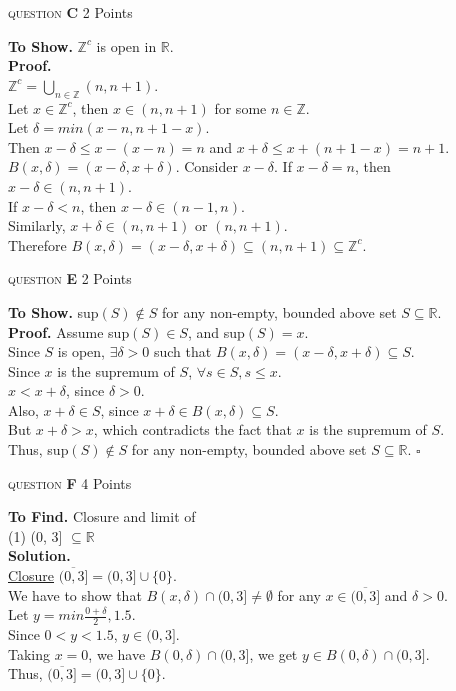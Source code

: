 \documentclass[11pt]{article}
\newcommand{\problem
}[2]{
\begin{mdframed}
    \textsc{question} \textbf{#1} \hfill #2
\end{mdframed}
}
\begin{document}
\problem{C}{2 Points}
\textbf{To Show. } $\mathbb{Z}^c$ is open in $\mathbb{R}$.\\
\textbf{Proof.}\\
$\mathbb{Z}^c = \underset{n \in \mathbb{Z}}{\bigcup} (n, n + 1)$.\\
Let $x \in \mathbb{Z}^c$, then $x \in (n, n + 1)$ for some $n \in \mathbb{Z}$.\\
Let $\delta = min(x - n, n + 1 - x)$.\\
Then $x - \delta \leq x - (x - n) = n$ and $x + \delta \leq x + (n + 1 - x) = n + 1$.\\
$B(x, \delta) = (x - \delta, x + \delta)$.
Consider $x - \delta$. If $x - \delta = n$, then $x - \delta \in (n, n + 1)$.\\
If $x - \delta < n$, then $x - \delta \in (n - 1, n)$.\\
Similarly, $x + \delta \in (n, n + 1)$ or $(n, n + 1)$.\\

\noindent Therefore $B(x, \delta) = (x - \delta, x + \delta) \subseteq (n, n + 1) \subseteq \mathbb{Z}^c$.\\


\problem{E}{2 Points}
\textbf{To Show.} sup$(S) \not\in S$ for any non-empty, bounded above set $S \subseteq \mathbb{R}$.\\
\textbf{Proof.} Assume sup$(S) \in S$, and sup$(S) = x$.\\
Since $S$ is open, $\exists \delta > 0$ such that $B(x, \delta) = (x - \delta, x + \delta) \subseteq S$.\\
Since $x$ is the supremum of $S$, $\forall s \in S, s \leq x$.
\\ $x < x + \delta$, since $\delta > 0$.\\
Also, $x + \delta \in S$, since $x + \delta \in B(x, \delta) \subseteq S$.\\
But $x + \delta > x$, which contradicts the fact that $x$ is the supremum of $S$.\\
Thus, sup$(S) \not\in S$ for any non-empty, bounded above set $S \subseteq \mathbb{R}$. \hfill $\square$\\






\problem{F}{4 Points}
\textbf{To Find. } Closure and limit of\\
(1) (0, 3] $\subseteq \mathbb{R}$\\
\textbf{Solution.} \\
\underline{Closure} $\overline{(0, 3]} = (0, 3] \cup \{0\}$.\\
We have to show that $B(x, \delta) \cap (0, 3] \neq \emptyset$ for any $x \in \overline{(0, 3]}$ and $\delta > 0$.\\
Let $y = min \frac{0 + \delta}{2}, 1.5$.\\
Since $0 < y < 1.5$, $y \in (0, 3]$.\\
Taking $x = 0$, we have $B(0, \delta) \cap (0, 3]$, we get $y \in B(0, \delta) \cap (0, 3]$.\\
Thus, $\overline{(0, 3]} = (0, 3] \cup \{0\}$.\\
\end{document}
